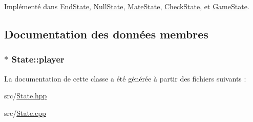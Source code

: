 Implémenté dans \hyperlink{class_end_state_a1983377ed8a1e391871fb40db39f13e3}{End\-State}, \hyperlink{class_null_state_a5a2b2f419bba204759bf344c8b7710d0}{Null\-State}, \hyperlink{class_mate_state_ab96d11c6cbb289483659d55bb8735c77}{Mate\-State}, \hyperlink{class_check_state_ace4965a79b3614c50d0db5396121b75e}{Check\-State}, et \hyperlink{class_game_state_a9ccc5473c6f04e60711cb9a438b276e5}{Game\-State}.



\subsection{Documentation des données membres}
\hypertarget{class_state_a9a024fd38161f32fc10b68b4ccb13226}{
\subsubsection[{player}]{$\ast$ State\-::player\hspace{0.3cm}{\ttfamily [protected]}}}\label{class_state_a9a024fd38161f32fc10b68b4ccb13226}


La documentation de cette classe a été générée à partir des fichiers suivants \-:\begin{DoxyCompactItemize}
\item 
src/\hyperlink{_state_8hpp}{State.\-hpp}\item 
src/\hyperlink{_state_8cpp}{State.\-cpp}\end{DoxyCompactItemize}
